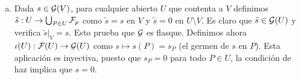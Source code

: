 \documentclass[twoside]{article}
\begin{document}
\begin{solucion}
\begin{enumerate}[(a)]
\item Dada $s\in\mathcal{G}(V)$, para cualquier abierto $U$ que contenta a $V$ definimos $\tilde{s}:U\to \bigcup_{P\in U}\mathcal{F}_p$ como $\tilde{s}=s$ en $V$ y $\tilde{s}=0$ en $U\setminus V$. Es claro que $\tilde{s}\in\mathcal{G}(U)$ y verifica $\tilde{s}|_V=s$. Esto prueba que $\mathcal{G}$ es flasque. Definimos ahora $\iota(U):\mathcal{F}(U)\to\mathcal{G}(U)$ como $s\mapsto s(P)=s_P$ (el germen de $s$ en $P$). Esta aplicación es inyectiva, puesto que $s_P=0$ para todo $P\in U$, la condición de haz implica que $s=0$. 
\end{enumerate}

\end{solucion}
%
%
%
%
%
%
%
%
%
%
%
%
%
%
%
%
%
%
%
%
%
%
\end{document}
